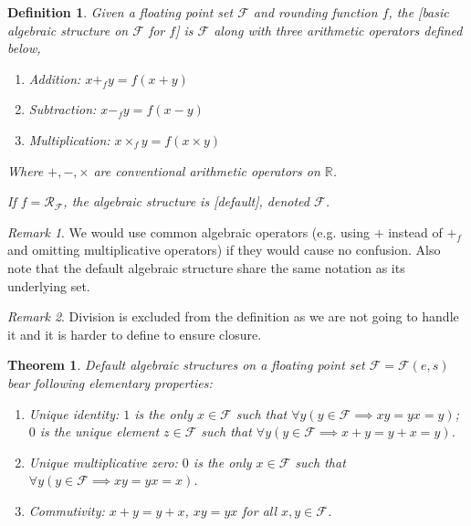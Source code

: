 \documentclass{book}
\newtheorem{definition}{Definition}
\newtheorem{theorem}{Theorem}
\theoremstyle{definition}\newtheorem{mechanism}{Mechanism}
\theoremstyle{remark}\newtheorem*{remark}{Remark}
\begin{document}
\begin{definition}
	Given a floating point set $\mathcal F$ and rounding function $f$, the [basic algebraic structure on $\mathcal F$ for $f$] is $\mathcal{F}$ along with three arithmetic operators defined below, 
	
	\begin{enumerate}
		\item Addition: $x +_f y = f(x + y)$
		\item Subtraction: $x -_f y = f(x - y)$
		\item Multiplication: $x \times_f y = f(x \times y)$
	\end{enumerate}
	
	Where $+, -, \times$ are conventional arithmetic operators on $\mathbb{R}$.
	
	If $f = \mathcal{R}_{\mathcal{F}}$, the algebraic structure is [default], denoted $\mathcal{F}$.
\end{definition}

\begin{remark}
	We would use common algebraic operators (e.g. using $+$ instead of $+_f$ and omitting multiplicative operators) if they would cause no confusion. Also note that the default algebraic structure share the same notation as its underlying set.
\end{remark}

\begin{remark}
	Division is excluded from the definition as we are not going to handle it and it is harder to define to ensure closure.
\end{remark}

\begin{theorem}
	Default algebraic structures on a floating point set $\mathcal F = \mathcal F(e, s)$ bear following elementary properties:
	
	\begin{enumerate}
		\item Unique identity: $1$ is the only $x\in\mathcal F$ such that $\forall y(y\in \mathcal{F} \implies xy = yx = y)$; $0$ is the unique element $z \in \mathcal F$ such that $\forall y(y \in \mathcal F \implies x+y = y+x = y)$.
		\item Unique multiplicative zero: $0$ is the only $x\in \mathcal F$ such that $\forall y(y\in\mathcal F \implies xy = yx = x)$.
		\item Commutivity: $x + y = y + x$, $xy = yx$ for all $x, y \in \mathcal F$.
	\end{enumerate}
\end{theorem}
\end{document}
